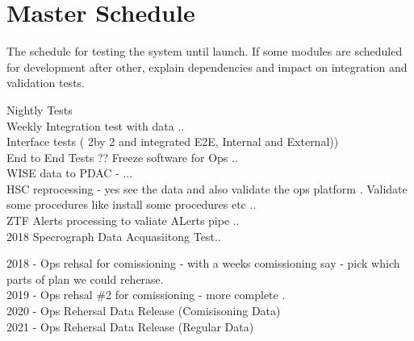 
\section{Master Schedule}

The schedule for testing the system until launch. If some modules are scheduled for development after other, explain dependencies and impact on integration and validation tests.


Nightly Tests \\

Weekly Integration test with data .. \\

Interface tests ( 2by 2 and integrated E2E, Internal and External)) \\

End to End Tests ?? Freeze software for Ops .. \\

WISE data to PDAC - ...\\

HSC reprocessing - yes see the data and also validate the ops platform . Validate some procedures like install some procedures etc .. \\

ZTF Alerts processing to valiate ALerts pipe .. \\

2018 Specrograph Data Acquasiitong Test..

2018 - Ops rehsal for comissioning - with a weeks comissioning say - pick which parts of plan we could reherase.\\

2019 - Ops rehsal \#2 for comissioning - more complete .\\

2020 - Ops Rehersal Data Release (Comisisoning Data)\\
2021 - Ops Rehersal Data Release (Regular Data)\\


